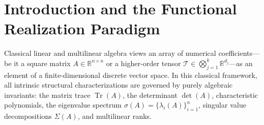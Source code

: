 \documentclass[11pt,a4paper,reqno]{amsart}
\theoremstyle{definition}
\numberwithin{equation}{section}
\newcommand{\R}{\mathbb{R}}
\newcommand{\Tr}{\operatorname{Tr}}
\begin{document}
\begin{abstract}
(6) \textbf{Quantum Information Geometry of Tensor Networks:} fiber-bundle continuous matrix product states defining the integrated Quantum Fisher Information (QFI) volume $\mathrm{Vol}_{\mathrm{QFI}}(\mathcal{T})$, continuous entanglement contours $\mathcal{S}_{\mathrm{cont}}(x)$, and spatial information centroids.
We prove rigorous existence, stability, and invariance theorems for each construction, providing an exhaustive classification that bridges continuous multilinear algebra, global differential geometry, and theoretical physics.
\end{abstract}


\maketitle

\tableofcontents

\newpage

\section{Introduction and the Functional Realization Paradigm}
\label{sec:intro}

Classical linear and multilinear algebra views an array of numerical coefficients---be it a square matrix $A \in \R^{n \times n}$ or a higher-order tensor $\mathcal{T} \in \bigotimes_{j=1}^k \R^{d_j}$---as an element of a finite-dimensional discrete vector space. In this classical framework, all intrinsic structural characterizations are governed by purely algebraic invariants: the matrix trace $\Tr(A)$, the determinant $\det(A)$, characteristic polynomials, the eigenvalue spectrum $\sigma(A) = \{\lambda_i(A)\}_{i=1}^n$, singular value decompositions $\Sigma(A)$, and multilinear ranks.
\end{document}

